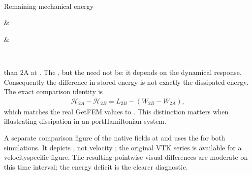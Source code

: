 \documentclass[letterpaper,10pt,english]{sphinxmanual}
\begin{document}
\begin{savenotes}
\begin{tabular}[t]{}
\\
\sphinxhline\begin{varwidth}[t]{}
\sphinxAtStartPar
Remaining mechanical energy 
\sphinxbeforeendvarwidth
\end{varwidth}%
&\begin{varwidth}[t]{}
\sphinxAtStartPar
{}
\sphinxbeforeendvarwidth
\end{varwidth}%
&\begin{varwidth}[t]{}
\sphinxAtStartPar
{}
\sphinxbeforeendvarwidth
\end{varwidth}%
\\
\sphinxbottomrule
\end{tabular}
\sphinxtableafterendhook\par
\sphinxattableend\end{savenotes}

\sphinxAtStartPar
{}
than 2A at . The , but the  need not
be: it depends on the dynamical response.
Consequently the difference in stored energy
is not exactly the dissipated energy.
The exact comparison identity is
\begin{equation*}
\begin{split}\mathcal H_{2A}-\mathcal H_{2B}
= L_{2B} - (W_{2B}-W_{2A}),\end{split}
\end{equation*}
\sphinxAtStartPar
which matches the real GetFEM values to
. This distinction matters when
illustrating dissipation in an 
port\sphinxhyphen{}Hamiltonian system.

\sphinxAtStartPar
A separate comparison figure of the native
fields  at  and  uses the
 for both simulations.
It depicts  , not velocity
; the original  VTK series
is available for a velocity\sphinxhyphen{}specific figure.
The resulting pointwise visual differences
are moderate on this time interval; the
energy deficit is the clearer diagnostic.
\end{document}
